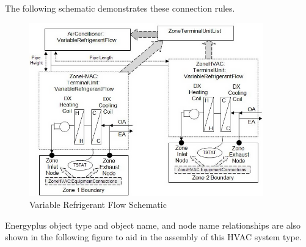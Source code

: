The following schematic demonstrates these connection rules.

\begin{figure}[hbtp] %
\centering
\includegraphics[width=0.9\textwidth, height=0.9\textheight, keepaspectratio=true]{media/image310.png}
\caption{Variable Refrigerant Flow Schematic \protect \label{fig:variable-refrigerant-flow-schematic}}
\end{figure}

Energyplus object type and object name, and node name relationships are also shown in the following figure to aid in the assembly of this HVAC system type.

